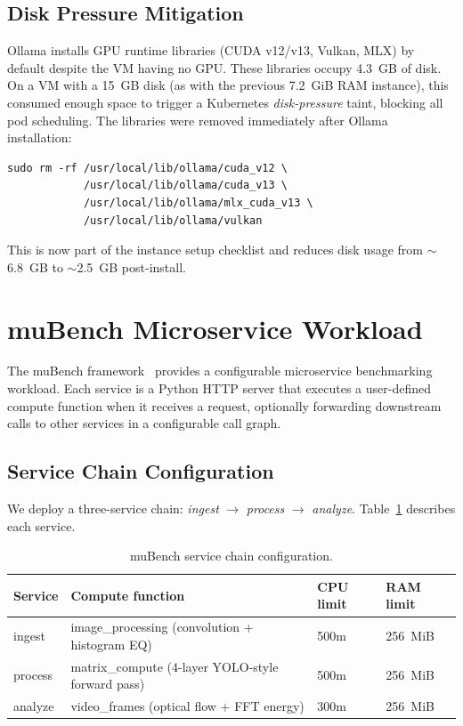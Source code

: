 \subsection{Disk Pressure Mitigation}
Ollama installs GPU runtime libraries (CUDA v12/v13, Vulkan, MLX) by default
despite the VM having no GPU. These libraries occupy 4.3~GB of disk. On a VM
with a 15~GB disk (as with the previous 7.2~GiB RAM instance), this consumed
enough space to trigger a Kubernetes \textit{disk-pressure} taint, blocking all
pod scheduling. The libraries were removed immediately after Ollama installation:

\begin{verbatim}
sudo rm -rf /usr/local/lib/ollama/cuda_v12 \
            /usr/local/lib/ollama/cuda_v13 \
            /usr/local/lib/ollama/mlx_cuda_v13 \
            /usr/local/lib/ollama/vulkan
\end{verbatim}

This is now part of the instance setup checklist and reduces disk usage from
$\sim$6.8~GB to $\sim$2.5~GB post-install.

\section{muBench Microservice Workload}
\label{sec:mubench-impl}

The muBench framework~\cite{detti2021mubench} provides a configurable
microservice benchmarking workload. Each service is a Python HTTP server that
executes a user-defined compute function when it receives a request, optionally
forwarding downstream calls to other services in a configurable call graph.

\subsection{Service Chain Configuration}
We deploy a three-service chain: \textit{ingest} $\to$ \textit{process}
$\to$ \textit{analyze}. Table~\ref{tab:mubench-services} describes each service.

\begin{table}[h]
  \centering
  \caption{muBench service chain configuration.}
  \label{tab:mubench-services}
  \begin{tabular}{llll}
    \toprule
    Service & Compute function & CPU limit & RAM limit \\
    \midrule
    ingest  & image\_processing (convolution + histogram EQ) & 500m & 256~MiB \\
    process & matrix\_compute (4-layer YOLO-style forward pass) & 500m & 256~MiB \\
    analyze & video\_frames (optical flow + FFT energy) & 300m & 256~MiB \\
    \bottomrule
  \end{tabular}
\end{table}

